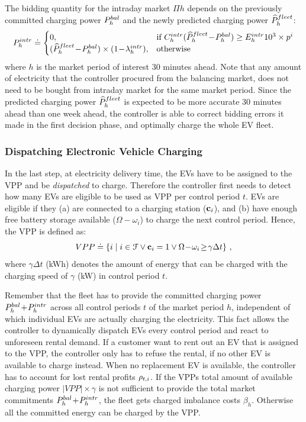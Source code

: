 \documentclass[a4paper, 12pt]{article}
\begin{document}
The bidding quantity for the intraday market \(\Pi{h}\) depends on the previously
committed charging power \(P^{bal}_{h}\) and the newly predicted charging power
\(\widehat{P}^{fleet}_{h}\):
\begin{equation} \label{eq-model-pi}
  P^{intr}_{h} \doteq
  \begin{cases}
    0, & \text{if}\ C^{intr}_{h}(\widehat{P}^{fleet}_{h}\!-\!P^{bal}_{h}) \geq E^{intr}_{h}10^3 \times p^{i}\\
    (\widehat{P}^{fleet}_{h}\!-\!P^{bal}_{h}) \times (1\!-\!\lambda^{intr}_{h}), & \text{otherwise}
  \end{cases}
\end{equation}
where \(h\) is the market period of interest 30 minutes ahead. Note that any
amount of electricity that the controller procured from the balancing market,
does not need to be bought from intraday market for the same market period.
Since the predicted charging power \(\widehat{P}^{fleet}_{h}\) is expected to be more
accurate 30 minutes ahead than one week ahead, the controller is able to correct
bidding errors it made in the first decision phase, and optimally charge the
whole EV fleet.

\subsubsection{Dispatching Electronic Vehicle Charging}
\label{sec:org84fc420}
In the last step, at electricity delivery time, the EVs have to be assigned to
the VPP and be \emph{dispatched} to charge. Therefore the controller first needs to
detect how many EVs are eligible to be used as VPP per control period \(t\). EVs
are eligible if they (a) are connected to a charging station (\({\bf{c}}_{i}\)), and (b)
have enough free battery storage available (\(\Omega\!-\!\omega_{i}\)) to charge
the next control period. Hence, the VPP is defined as:
\begin{equation}
    VPP \doteq \{i\;|\;i\in{\cal{F}} \vee {\bf{c}}_{i} = 1 \vee \Omega\!-\!\omega_{i}\!\geq\!\gamma\Delta{t}\} \text{ ,}
\end{equation}
where \(\gamma\Delta{t}\) (kWh) denotes the amount of energy that can be charged
with the charging speed of \(\gamma\) (kW) in control period \(t\).

Remember that the fleet has to provide the committed charging power
\(P^{bal}_{h}\!+\!P^{intr}_{h}\) across all control periods \(t\) of the market period \(h\),
independent of which individual EVs are actually charging the electricity. This
fact allows the controller to dynamically dispatch EVs every control period and
react to unforeseen rental demand. If a customer want to rent out an EV that is
assigned to the VPP, the controller only has to refuse the rental, if no other
EV is available to charge instead. When no replacement EV is available, the
controller has to account for lost rental profits \(\rho_{t,i}\). If the VPPs total
amount of available charging power \(|VPP|\!\times\!\gamma\) is not sufficient to
provide the total market commitments \(P^{bal}_{h}\!+\!P^{intr}_{h}\), the fleet gets charged
imbalance costs \(\beta_{h}\). Otherwise all the committed energy can be charged
by the VPP.
\end{document}
